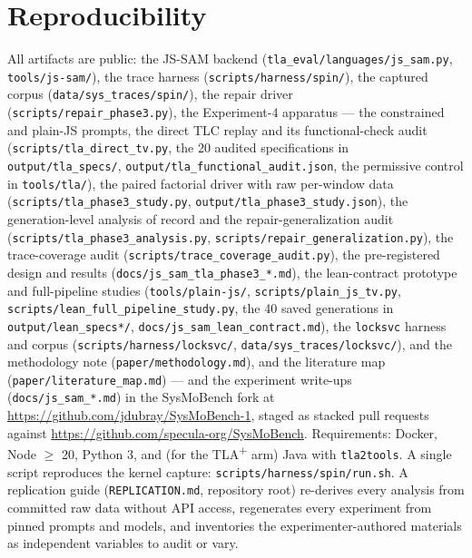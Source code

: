 \documentclass[11pt]{article}
\newcommand{\jssam}{JS-SAM}
\newcommand{\tlaplus}{TLA\texorpdfstring{\textsuperscript{+}}{+}}
\begin{document}
\section*{Reproducibility}
All artifacts are public: the \jssam{} backend
(\texttt{tla\_eval/languages/js\_sam.py}, \texttt{tools/js-sam/}), the trace
harness (\texttt{scripts/harness/spin/}), the captured corpus
(\texttt{data/sys\_traces/spin/}), the repair driver
(\texttt{scripts/repair\_phase3.py}), the Experiment-4 apparatus --- the
constrained and plain-JS prompts, the direct TLC replay and its
functional-check audit (\texttt{scripts/tla\_direct\_tv.py}, the 20 audited
specifications in \texttt{output/tla\_specs/},
\texttt{output/tla\_functional\_audit.json}, the permissive control in
\texttt{tools/tla/}), the paired factorial driver with raw
per-window data (\texttt{scripts/tla\_phase3\_study.py},
\texttt{output/tla\_phase3\_study.json}), the generation-level analysis of
record and the repair-generalization audit
(\texttt{scripts/tla\_phase3\_analysis.py},
\texttt{scripts/repair\_generalization.py}), the trace-coverage audit
(\texttt{scripts/trace\_coverage\_audit.py}), the pre-registered design and
results (\texttt{docs/js\_sam\_tla\_phase3\_*.md}), the lean-contract
prototype and full-pipeline studies (\texttt{tools/plain-js/},
\texttt{scripts/plain\_js\_tv.py},
\texttt{scripts/lean\_full\_pipeline\_study.py}, the 40 saved generations in
\texttt{output/lean\_specs*/}, \texttt{docs/js\_sam\_lean\_contract.md}),
the \texttt{locksvc} harness and corpus
(\texttt{scripts/harness/locksvc/}, \texttt{data/sys\_traces/locksvc/}), and
the methodology note
(\texttt{paper/methodology.md}), and the literature map
(\texttt{paper/literature\_map.md}) --- and the experiment
write-ups
(\texttt{docs/js\_sam\_*.md}) in the SysMoBench fork at
\url{https://github.com/jdubray/SysMoBench-1}, staged as stacked pull
requests against \url{https://github.com/specula-org/SysMoBench}.
Requirements: Docker, Node $\geq$ 20, Python 3, and (for the \tlaplus{} arm)
Java with \texttt{tla2tools}. A single script reproduces the kernel capture:
\texttt{scripts/harness/spin/run.sh}. A replication guide
(\texttt{REPLICATION.md}, repository root) re-derives every analysis from
committed raw data without API access, regenerates every experiment from
pinned prompts and models, and inventories the experimenter-authored
materials as independent variables to audit or vary.
\end{document}
